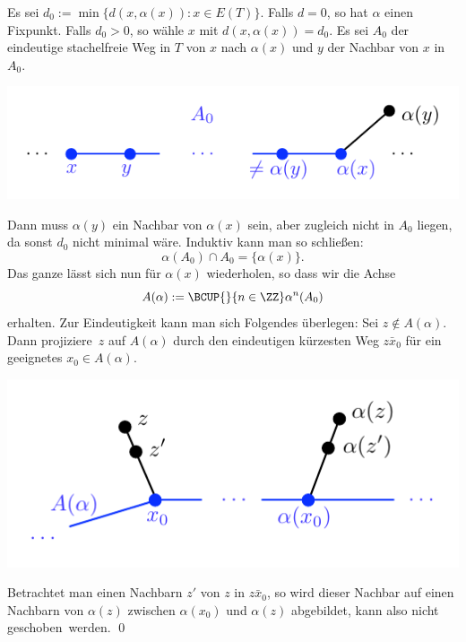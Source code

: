 \bew Es sei $d_0:=\min\{d(x,\alpha(x)):x\in E(T)\}$. Falls $d=0$,
so hat $\alpha$ einen Fixpunkt. Falls $d_0>0$, so wähle $x$ mit
$d(x,\alpha(x))=d_0$. Es sei $A_0$ der eindeutige stachelfreie Weg
in $T$ von $x$ nach $\alpha(x)$ und $y$ der Nachbar von $x$ in $A_0$.
\begin{center}
	\includegraphics{grugraImages/A0}
\end{center}
Dann muss $\alpha(y)$ ein Nachbar von $\alpha(x)$ sein, aber
zugleich nicht in $A_0$ liegen, da sonst $d_0$ nicht minimal wäre.
Induktiv kann man so schließen:
\[
\alpha(A_0) \cap A_0 = \{\alpha(x)\}.
\]
Das ganze lässt sich nun für $\alpha(x)$ wiederholen, so dass wir
die Achse
\[
A(\alpha) := \BCUP{}{n\in\ZZ} \alpha^n(A_0)
\]
erhalten. Zur Eindeutigkeit kann man sich Folgendes überlegen:
Sei $z\not\in A(\alpha)$. Dann \glqq projiziere\grqq\ $z$ auf
$A(\alpha)$ durch den eindeutigen kürzesten Weg $\bar{zx_0}$
für ein geeignetes $x_0\in A(\alpha)$.
\begin{center}
	\includegraphics{grugraImages/Aalpha}
\end{center}
Betrachtet man einen Nachbarn $z'$ von $z$ in $\bar{zx_0}$, so
wird dieser Nachbar auf einen Nachbarn von $\alpha(z)$ zwischen
$\alpha(x_0)$ und $\alpha(z)$ abgebildet, kann also nicht
\glqq geschoben\grqq\ werden.
\qed